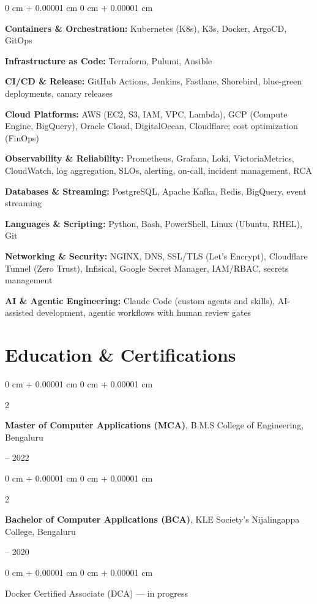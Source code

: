 \documentclass[10pt, a4paper]{article}
\newenvironment{onecolentry}{
    \begin{adjustwidth}{
        0 cm + 0.00001 cm
    }{
        0 cm + 0.00001 cm
    }
}{
    \end{adjustwidth}
} %
\newenvironment{twocolentry}[2][]{
    \onecolentry
    \def\secondColumn{#2}
    \setcolumnwidth{\fill, 4.5 cm}
    \begin{paracol}{2}
}{
    \switchcolumn \raggedleft \secondColumn
    \end{paracol}
    \endonecolentry
} %
\begin{document}
\begin{onecolentry}
\textbf{Containers \& Orchestration:} Kubernetes (K8s), K3s, Docker, ArgoCD, GitOps

\textbf{Infrastructure as Code:} Terraform, Pulumi, Ansible

\textbf{CI/CD \& Release:} GitHub Actions, Jenkins, Fastlane, Shorebird, blue-green deployments, canary releases

\textbf{Cloud Platforms:} AWS (EC2, S3, IAM, VPC, Lambda), GCP (Compute Engine, BigQuery), Oracle Cloud, DigitalOcean, Cloudflare; cost optimization (FinOps)

\textbf{Observability \& Reliability:} Prometheus, Grafana, Loki, VictoriaMetrics, CloudWatch, log aggregation, SLOs, alerting, on-call, incident management, RCA

\textbf{Databases \& Streaming:} PostgreSQL, Apache Kafka, Redis, BigQuery, event streaming

\textbf{Languages \& Scripting:} Python, Bash, PowerShell, Linux (Ubuntu, RHEL), Git

\textbf{Networking \& Security:} NGINX, DNS, SSL/TLS (Let's Encrypt), Cloudflare Tunnel (Zero Trust), Infisical, Google Secret Manager, IAM/RBAC, secrets management

\textbf{AI \& Agentic Engineering:} Claude Code (custom agents and skills), AI-assisted development, agentic workflows with human review gates
\end{onecolentry}

\section{Education \& Certifications}

\begin{twocolentry}{2020 -- 2022}
\textbf{Master of Computer Applications (MCA)}, B.M.S College of Engineering, Bengaluru
\end{twocolentry}

\vspace{0.08 cm}

\begin{twocolentry}{2017 -- 2020}
\textbf{Bachelor of Computer Applications (BCA)}, KLE Society's Nijalingappa College, Bengaluru
\end{twocolentry}

\vspace{0.10 cm}

\begin{onecolentry}
Docker Certified Associate (DCA) --- in progress
\end{onecolentry}
\end{document}
